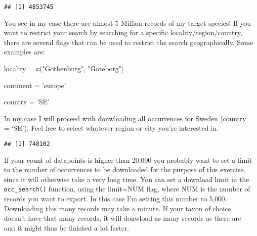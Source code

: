 \documentclass[]{article}
\newenvironment{Shaded}{\begin{snugshade}}{\end{snugshade}}
\newcommand{\DataTypeTok}[1]{\textcolor[rgb]{0.13,0.29,0.53}{#1}}
\newcommand{\KeywordTok}[1]{\textcolor[rgb]{0.13,0.29,0.53}{\textbf{#1}}}
\newcommand{\NormalTok}[1]{#1}
\newcommand{\OperatorTok}[1]{\textcolor[rgb]{0.81,0.36,0.00}{\textbf{#1}}}
\newcommand{\OtherTok}[1]{\textcolor[rgb]{0.56,0.35,0.01}{#1}}
\newcommand{\StringTok}[1]{\textcolor[rgb]{0.31,0.60,0.02}{#1}}
\begin{document}
\begin{Shaded}
\end{Shaded}

\begin{verbatim}
## [1] 4853745
\end{verbatim}

You see in my case there are almost 5 Million records of my target
species! If you want to restrict your search by searching for a specific
locality/region/country, there are several flags that can be used to
restrict the search geographically. Some examples are:

\begin{Shaded}
\begin{Highlighting}[]
\NormalTok{locality =}\StringTok{ }\KeywordTok{c}\NormalTok{(}\StringTok{"Gothenburg"}\NormalTok{, }\StringTok{"Göteborg"}\NormalTok{)}

\NormalTok{continent =}\StringTok{ 'europe'}

\NormalTok{country =}\StringTok{ 'SE'}
\end{Highlighting}
\end{Shaded}

In my case I will proceed with donwloading all occurrences for Sweden
(country = `SE'). Feel free to select whatever region or city you're
interested in.

\begin{Shaded}
\end{Shaded}

\begin{verbatim}
## [1] 748102
\end{verbatim}

If your count of datapoints is higher than 20,000 you probably want to
set a limit to the number of occurrences to be downloaded for the
purpose of this exercise, since it will otherwise take a very long time.
You can set a download limit in the \texttt{occ\_search()} function,
using the limit=NUM flag, where NUM is the number of records you want to
export. In this case I'm setting this number to 5,000. Downloading this
many records may take a minute. If your taxon of choice doesn't have
that many records, it will donwload as many records as there are and it
might thus be finished a lot faster.
\end{document}
